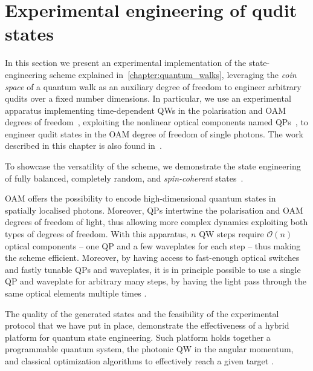 
\chapter{Experimental engineering of qudit states}
\label{chapter:experimental_engineering_qudits}

 In this section we present an experimental implementation of the state-engineering scheme explained in~\cref{chapter:quantum_walks}, leveraging the \emph{coin space} of a quantum walk as an auxiliary degree of freedom to engineer arbitrary qudits over a fixed number dimensions.
In particular, we use an experimental apparatus implementing time-dependent \acp{QW} in the polarisation and \ac{OAM} degrees of freedom~\cite{zhang2010implementation,goyal2013implementing,cardano2015quantum}, exploiting the nonlinear optical components named \acp{QP}~\cite{marrucci2006optical}, to engineer qudit states in the \ac{OAM} degree of freedom of single photons.
The work described in this chapter is also found in~\cite{giordani2019experimental}.

To showcase the versatility of the scheme, we demonstrate the state engineering of fully balanced, completely random, and \emph{spin-coherent} states~\cite{brune1992manipulation,monroe1996schrodinger}.

 \acf{OAM} offers the possibility to encode high-dimensional quantum states in spatially localised photons. Moreover, \acp{QP} intertwine the polarisation and \ac{OAM} degrees of freedom of light, thus allowing more complex dynamics exploiting both types of degrees of freedom.
With this apparatus, $n$ \ac{QW} steps require $\mathcal O(n)$ optical components -- one \ac{QP} and a few waveplates for each step -- thus making the scheme efficient. Moreover, by having access to fast-enough optical switches and fastly tunable \acp{QP} and waveplates, it is in principle possible to use a single \ac{QP} and waveplate for arbitrary many steps, by having the light pass through the same optical elements multiple times .


The quality of the generated states and the feasibility of the experimental protocol that we have put in place, demonstrate the effectiveness of a hybrid platform for quantum state engineering. Such platform holds together a programmable quantum system, the photonic \ac{QW} in the angular momentum, and classical optimization algorithms to effectively reach a given target .

